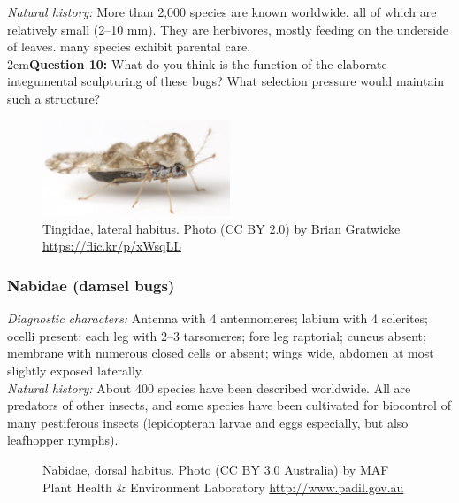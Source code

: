 \documentclass[letterpaper, 11pt]{article}
\begin{document}
\noindent{}\textit{Natural history:} More than 2,000 species are known worldwide, all of which are relatively small (2--10 mm). They are herbivores, mostly feeding on the underside of leaves. many species exhibit parental care. \\

\hangindent2em\textbf{Question 10:} What do you think is the function of the elaborate integumental sculpturing of these bugs? What selection pressure would maintain such a structure?\\

\begin{figure}[ht!]
 \centering
 \includegraphics[width=0.5\textwidth]{TingidHabitus}
 \caption{Tingidae, lateral habitus. Photo (CC BY 2.0) by Brian Gratwicke \url{https://flic.kr/p/xWsqLL}}
 \label{fig:tingid1}
\end{figure}

\subsubsection{Nabidae (damsel bugs)}
\noindent{}\textit{Diagnostic characters:} Antenna with 4 antennomeres; labium with 4 sclerites; ocelli present; each leg with 2--3 tarsomeres; fore leg raptorial; cuneus absent; membrane with numerous closed cells or absent; wings wide, abdomen at most slightly exposed laterally.\\

\noindent{}\textit{Natural history:} About 400 species have been described worldwide. All are predators of other insects, and some species have been cultivated for biocontrol of many pestiferous insects (lepidopteran larvae and eggs especially, but also leafhopper nymphs). \\

\begin{figure}[ht!]
 \centering
 \caption{Nabidae, dorsal habitus. Photo (CC BY 3.0 Australia) by MAF Plant Health \& Environment Laboratory \url{http://www.padil.gov.au}}
 \label{fig:nabid1}
\end{figure}
\end{document}
